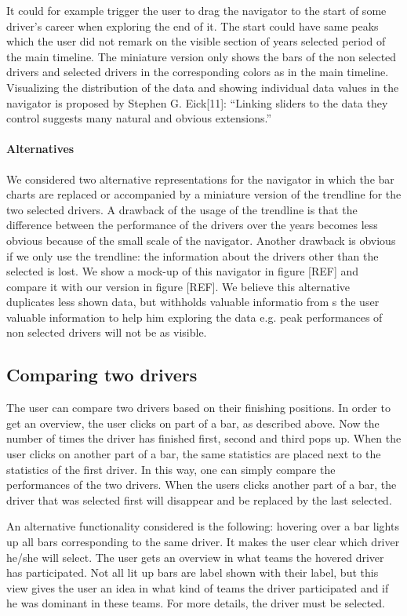 \documentclass{sigchi}
\begin{document}
It could for example trigger the user to drag the navigator to the start of some driver’s career when exploring the end of it. The start could have same peaks which the user did not remark on the visible section of years selected period of the main timeline. The miniature version only shows the bars of the non selected drivers and selected drivers in the corresponding colors as in the main timeline. Visualizing the distribution of the data and showing individual data values in the navigator is proposed by Stephen G. Eick[11]: “Linking sliders to the data they control suggests many natural and obvious extensions.”


\paragraph{Alternatives}
We considered two alternative representations for the navigator in which the bar charts are replaced or accompanied by a miniature version of the trendline for the two selected drivers. A drawback of the usage of the trendline is that the difference between the performance of the drivers over the years becomes less obvious because of the small scale of the navigator. Another drawback is obvious if we only use the trendline: the information about the drivers other than the selected is lost.
 We show a mock-up of this navigator in figure [REF] and compare it with our version in figure [REF]. We believe this alternative duplicates less shown data, but withholds valuable informatio from s the user  valuable information to help him exploring the data e.g. peak performances of non selected drivers will not be as visible.


\subsection{Comparing two drivers}
The user can compare two drivers based on their finishing positions. In order to get an overview, the user clicks on part of a bar, as described above. Now the number of times the driver has finished first, second and third pops up. When the user clicks on another part of a bar, the same statistics are placed next to the statistics of the first driver. In this way, one can simply compare the performances of the two drivers. When the users clicks another part of a bar, the driver that was selected first will disappear and be replaced by the last selected.

An alternative functionality considered is the following: hovering over a bar lights up all bars corresponding to the same driver. It makes the user clear which driver he/she will select. The user gets an overview in what teams the hovered driver has participated. Not all lit up bars are label shown with their label, but this view gives the user an idea in what kind of teams the driver participated and if he was dominant in these teams. For more details, the driver must be selected.
\end{document}
